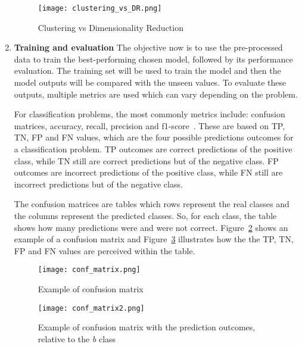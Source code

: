\begin{enumerate}
    \begin{figure}[htbp]
        \centering
        \texttt{[image: clustering\_vs\_DR.png]}
        \caption{Clustering vs Dimensionality Reduction~\cite{Beck2020AModelling}}
        \label{fig:clustering_vs_DR}
    \end{figure}
    
    \item \textbf{Training and evaluation} The objective now is to use the pre-processed data to train the best-performing chosen model, followed by its performance evaluation. 
    The training set will be used to train the model and then the model outputs will be compared with the unseen values. To evaluate these outputs, multiple metrics are used which can vary depending on the problem. 
    
    For classification problems, the most commonly metrics include: confusion matrices, accuracy, recall, precision and f1-score~\cite{Liu2014AEvaluation}. These are based on \gls{TP}, \gls{TN}, \gls{FP} and \gls{FN} values, which are the four possible predictions outcomes for a classification problem. \gls{TP} outcomes are correct predictions of the positive class, while \gls{TN} still are correct predictions but of the negative class. \gls{FP} outcomes are incorrect predictions of the positive class, while \gls{FN} still are incorrect predictions but of the negative class. 
    
    The confusion matrices are tables which rows represent the real classes and the columns represent the predicted classes. So, for each class, the table shows how many predictions were and were not correct. Figure~\ref{fig:conf_matrix} shows an example of a confusion matrix and Figure~\ref{fig:conf_matrix2} illustrates how the the \gls{TP}, \gls{TN}, \gls{FP} and \gls{FN} values are perceived within the table.
    
    \begin{figure}[htbp]
        \centering
        \texttt{[image: conf\_matrix.png]}
        \caption{Example of confusion matrix~\cite{Grandini2020MetricsOverview}}
        \label{fig:conf_matrix}
    \end{figure}
    
    \begin{figure}[htbp]
        \centering
        \texttt{[image: conf\_matrix2.png]}
        \caption{Example of confusion matrix with the prediction outcomes, relative to the \textit{b} class~\cite{Grandini2020MetricsOverview}}
        \label{fig:conf_matrix2}
    \end{figure}
    

\end{enumerate}
